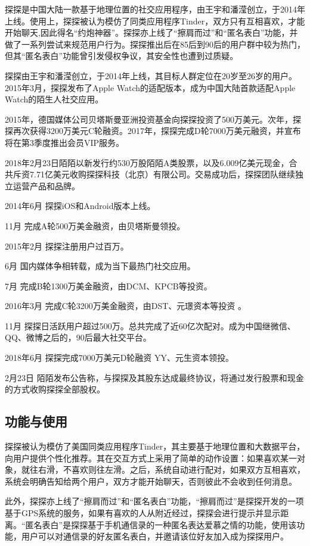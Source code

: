 \documentclass[UTF8]{ctexart}
\begin{document}
探探是中国大陆一款基于地理位置的社交应用程序，由王宇和潘滢创立，于2014年上线。使用上，探探被认为模仿了同类应用程序Tinder，双方只有互相喜欢，才能开始聊天,因此得名“约炮神器”。探探亦上线了“擦肩而过”和“匿名表白”功能，并做了一系列尝试来规范用户行为。探探推出后在85后到90后的用户群中较为热门，但其“匿名表白”功能曾引发侵权争议，其安全性也遭到过质疑。

探探由王宇和潘滢创立，于2014年上线，其目标人群定位在20岁至26岁的用户。2015年3月，探探发布了Apple Watch的适配版本，成为中国大陆首款适配Apple Watch的陌生人社交应用。

2015年，德国媒体公司贝塔斯曼亚洲投资基金向探探投资了500万美元。次年，探探再次获得3200万美元C轮融资。2017年，探探完成D轮7000万美元融资，并宣布将在第3季度推出会员VIP服务。

2018年2月23日陌陌以新发行约530万股陌陌A类股票，以及6.009亿美元现金，合共斥资7.71亿美元收购探探科技（北京）有限公司。交易成功后，探探团队继续独立运营产品和品牌。

\begin{tcolorbox}
    2014年6月 探探iOS和Android版本上线。

    11月 完成A轮500万美金融资，由贝塔斯曼领投。

    2015年2月 探探注册用户过百万。

    6月 国内媒体争相转载，成为当下最热门社交应用。

    7月 完成B轮1300万美金融资，由DCM、KPCB等投资。

    2016年3月 完成C轮3200万美金融资，由DST、元璟资本等投资 。

    11月 探探日活跃用户超过500万。总共完成了近60亿次配对。成为中国继微信、QQ、微博之后的，90后最大社交平台。

    2018年6月 探探完成7000万美元D轮融资 YY、元生资本领投。

    2月23日 陌陌发布公告称，与探探及其股东达成最终协议，将通过发行股票和现金的方式收购探探全部股权。\cite{MoMoHistory}
\end{tcolorbox}

\subsection{功能与使用}
探探被认为模仿了美国同类应用程序Tinder，其主要基于地理位置和大数据平台，向用户提供个性化推荐。其在交互方式上采用了简单的动作设置：如果喜欢某一对象，就往右滑，不喜欢则往左滑。之后，系统自动进行配对，如果双方互相喜欢，系统会明确告知给两个用户，双方才能开始聊天，否则彼此不会收到任何消息。

此外，探探亦上线了“擦肩而过”和“匿名表白”功能，“擦肩而过”是探探开发的一项基于GPS系统的服务，如果有喜欢的人从附近经过，探探会进行提示并显示距离。“匿名表白”是探探基于手机通信录的一种匿名表达爱慕之情的功能，使用该功能，用户可以对通信录的好友匿名表白，并邀请该位好友加入成为探探用户。
\end{document}
